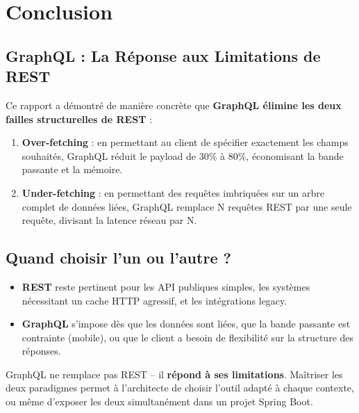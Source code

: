 \documentclass[12pt,a4paper]{article}
\begin{document}
\newpage

\section{Conclusion}

\subsection{GraphQL : La Réponse aux Limitations de REST}

Ce rapport a démontré de manière concrète que \textbf{GraphQL élimine les deux failles structurelles de REST} :

\begin{enumerate}[leftmargin=1.5cm]
    \item \textbf{Over-fetching} : en permettant au client de spécifier exactement les champs souhaités, GraphQL réduit le payload de 30\% à 80\%, économisant la bande passante et la mémoire.

    \item \textbf{Under-fetching} : en permettant des requêtes imbriquées sur un arbre complet de données liées, GraphQL remplace N requêtes REST par une seule requête, divisant la latence réseau par N.
\end{enumerate}

\subsection{Quand choisir l'un ou l'autre ?}

\begin{itemize}
    \item \textbf{REST} reste pertinent pour les API publiques simples, les systèmes nécessitant un cache HTTP agressif, et les intégrations legacy.
    \item \textbf{GraphQL} s'impose dès que les données sont liées, que la bande passante est contrainte (mobile), ou que le client a besoin de flexibilité sur la structure des réponses.
\end{itemize}

\begin{infobox}[title={Mot de la fin}]
GraphQL ne remplace pas REST -- il \textbf{répond à ses limitations}. Maîtriser les deux paradigmes permet à l'architecte de choisir l'outil adapté à chaque contexte, ou même d'exposer les deux simultanément dans un projet Spring Boot.
\end{infobox}
\end{document}
